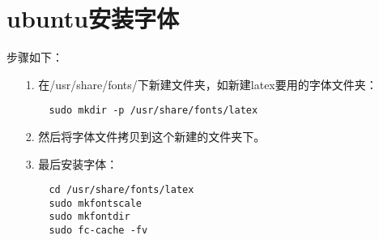 \documentclass[a4paper,left=2.5cm,right=2.5cm,11pt]{article}
\begin{document}


\section{ubuntu安装字体}

	步骤如下：
	\begin{itemize}
		\item[1.] 在/usr/share/fonts/下新建文件夹，如新建latex要用的字体文件夹：
		\begin{lstlisting}
	sudo mkdir -p /usr/share/fonts/latex
		\end{lstlisting}

		\item[2.] 然后将字体文件拷贝到这个新建的文件夹下。

		\item[3.] 最后安装字体：
		\begin{lstlisting}
	cd /usr/share/fonts/latex
	sudo mkfontscale
	sudo mkfontdir 
	sudo fc-cache -fv 
		\end{lstlisting}
	\end{itemize}
\end{document}
